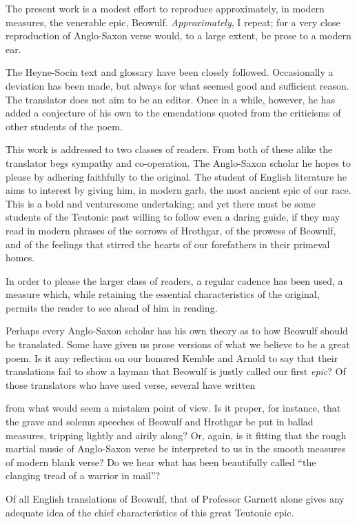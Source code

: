 
The present work is a modest effort to reproduce approximately, in modern
measures, the venerable epic, Beowulf. \emph{Approximately}, I repeat; for a very
close reproduction of Anglo-Saxon verse would, to a large extent, be prose to
a modern ear.

The Heyne-Socin text and glossary have been closely followed. Occasionally
a deviation has been made, but always for what seemed good and sufficient
reason. The translator does not aim to be an editor. Once in a while, however,
he has added a conjecture of his own to the emendations quoted from
the criticisms of other students of the poem.

This work is addressed to two classes of readers. From both of these alike
the translator begs sympathy and co-operation. The Anglo-Saxon scholar he
hopes to please by adhering faithfully to the original. The student of English
literature he aims to interest by giving him, in modern garb, the most ancient
epic of our race. This is a bold and venturesome undertaking; and yet there
must be some students of the Teutonic past willing to follow even a daring
guide, if they may read in modern phrases of the sorrows of Hrothgar, of the
prowess of Beowulf, and of the feelings that stirred the hearts of our forefathers
in their primeval homes.

In order to please the larger class of readers, a regular cadence has been
used, a measure which, while retaining the essential characteristics of the original,
permits the reader to see ahead of him in reading.

Perhaps every Anglo-Saxon scholar has his own theory as to how Beowulf
should be translated. Some have given us prose versions of what we believe
to be a great poem. Is it any reflection on our honored Kemble and Arnold
to say that their translations fail to show a layman that Beowulf is justly called
our first \emph{epic}? Of those translators who have used verse, several have written

from what would seem a mistaken point of view. Is it proper, for instance,
that the grave and solemn speeches of Beowulf and Hrothgar be put in ballad
measures, tripping lightly and airily along? Or, again, is it fitting that the
rough martial music of Anglo-Saxon verse be interpreted to us in the smooth
measures of modern blank verse? Do we hear what has been beautifully called
“the clanging tread of a warrior in mail”?

Of all English translations of Beowulf, that of Professor Garnett alone
gives any adequate idea of the chief characteristics of this great Teutonic
epic.

